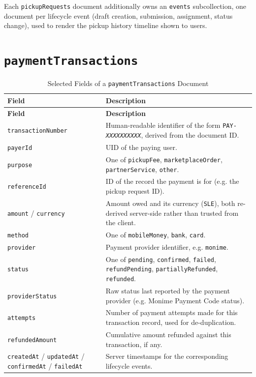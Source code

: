 Each \texttt{pickupRequests} document additionally owns an \texttt{events}
subcollection, one document per lifecycle event (draft creation,
submission, assignment, status change), used to render the pickup history
timeline shown to users.

\section{\texttt{paymentTransactions}}

\begin{longtable}{@{}p{3.6cm}p{9.4cm}@{}}
\caption{Selected Fields of a \texttt{paymentTransactions} Document} \label{tab:schema-payment} \\
\toprule \textbf{Field} & \textbf{Description} \\ \midrule
\endfirsthead
\toprule \textbf{Field} & \textbf{Description} \\ \midrule
\endhead
\texttt{transactionNumber} & Human-readable identifier of the form \texttt{PAY-\textit{XXXXXXXXXX}}, derived from the document ID. \\
\texttt{payerId} & UID of the paying user. \\
\texttt{purpose} & One of \texttt{pickupFee}, \texttt{marketplaceOrder}, \texttt{partnerService}, \texttt{other}. \\
\texttt{referenceId} & ID of the record the payment is for (e.g. the pickup request ID). \\
\texttt{amount} / \texttt{currency} & Amount owed and its currency (\texttt{SLE}), both re-derived server-side rather than trusted from the client. \\
\texttt{method} & One of \texttt{mobileMoney}, \texttt{bank}, \texttt{card}. \\
\texttt{provider} & Payment provider identifier, e.g. \texttt{monime}. \\
\texttt{status} & One of \texttt{pending}, \texttt{confirmed}, \texttt{failed}, \texttt{refundPending}, \texttt{partiallyRefunded}, \texttt{refunded}. \\
\texttt{providerStatus} & Raw status last reported by the payment provider (e.g. Monime Payment Code status). \\
\texttt{attempts} & Number of payment attempts made for this transaction record, used for de-duplication. \\
\texttt{refundedAmount} & Cumulative amount refunded against this transaction, if any. \\
\texttt{createdAt} / \texttt{updatedAt} / \texttt{confirmedAt} / \texttt{failedAt} & Server timestamps for the corresponding lifecycle events. \\
\bottomrule
\end{longtable}

